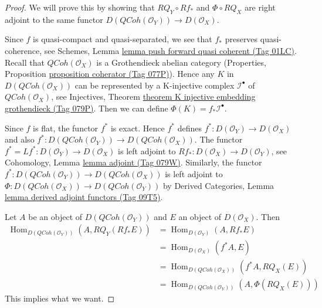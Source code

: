 \documentclass{amsart}
\theoremstyle{plain}
\theoremstyle{definition}
\theoremstyle{remark}
\numberwithin{equation}{subsection}
\def\Hom{\mathop{\mathrm{Hom}}\nolimits}
\def\QCoh{\mathit{QCoh}}
\begin{document}
\begin{proof}
We will prove this by showing that $RQ_Y \circ Rf_*$ and $\Phi \circ RQ_X$
are right adjoint to the same functor
$D(\QCoh(\mathcal{O}_Y)) \to D(\mathcal{O}_X)$.

\medskip\noindent
Since $f$ is quasi-compact and quasi-separated, we see that
$f_*$ preserves quasi-coherence, see
Schemes, Lemma \href{https://stacks.math.columbia.edu/tag/01LC}{lemma push forward quasi coherent (Tag 01LC)}.
Recall that $\QCoh(\mathcal{O}_X)$ is a Grothendieck abelian category
(Properties, Proposition \href{https://stacks.math.columbia.edu/tag/077P}{proposition coherator (Tag 077P)}).
Hence any $K$ in $D(\QCoh(\mathcal{O}_X))$
can be represented by a K-injective complex $\mathcal{I}^\bullet$
of $\QCoh(\mathcal{O}_X)$, see
Injectives, Theorem
\href{https://stacks.math.columbia.edu/tag/079P}{theorem K injective embedding grothendieck (Tag 079P)}.
Then we can define $\Phi(K) = f_*\mathcal{I}^\bullet$.

\medskip\noindent
Since $f$ is flat, the functor $f^*$ is exact. Hence $f^*$ defines
$f^* : D(\mathcal{O}_Y) \to D(\mathcal{O}_X)$ and also
$f^* : D(\QCoh(\mathcal{O}_Y)) \to D(\QCoh(\mathcal{O}_X))$.
The functor $f^* = Lf^* : D(\mathcal{O}_Y) \to D(\mathcal{O}_X)$
is left adjoint to
$Rf_* : D(\mathcal{O}_X) \to D(\mathcal{O}_Y)$,
see Cohomology, Lemma \href{https://stacks.math.columbia.edu/tag/079W}{lemma adjoint (Tag 079W)}.
Similarly, the functor
$f^* : D(\QCoh(\mathcal{O}_Y)) \to D(\QCoh(\mathcal{O}_X))$
is left adjoint to
$\Phi : D(\QCoh(\mathcal{O}_X)) \to D(\QCoh(\mathcal{O}_Y))$
by Derived Categories, Lemma \href{https://stacks.math.columbia.edu/tag/09T5}{lemma derived adjoint functors (Tag 09T5)}.

\medskip\noindent
Let $A$ be an object of $D(\QCoh(\mathcal{O}_Y))$ and
$E$ an object of $D(\mathcal{O}_X)$. Then
\begin{align*}
\Hom_{D(\QCoh(\mathcal{O}_Y))}(A, RQ_Y(Rf_*E))
& =
\Hom_{D(\mathcal{O}_Y)}(A, Rf_*E) \\
& =
\Hom_{D(\mathcal{O}_X)}(f^*A, E) \\
& =
\Hom_{D(\QCoh(\mathcal{O}_X))}(f^*A, RQ_X(E)) \\
& =
\Hom_{D(\QCoh(\mathcal{O}_Y))}(A, \Phi(RQ_X(E)))
\end{align*}
This implies what we want.
\end{proof}
\end{document}

